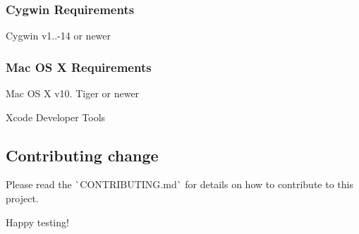 \subsubsection*{Cygwin Requirements}


\begin{DoxyItemize}
\item Cygwin v1..-\/14 or newer
\end{DoxyItemize}

\subsubsection*{Mac OS X Requirements}


\begin{DoxyItemize}
\item Mac OS X v10. Tiger or newer
\item Xcode Developer Tools
\end{DoxyItemize}

\subsection*{Contributing change}

Please read the \`{}\+C\+O\+N\+T\+R\+I\+B\+U\+T\+I\+NG.md\`{} for details on how to contribute to this project.

Happy testing! 